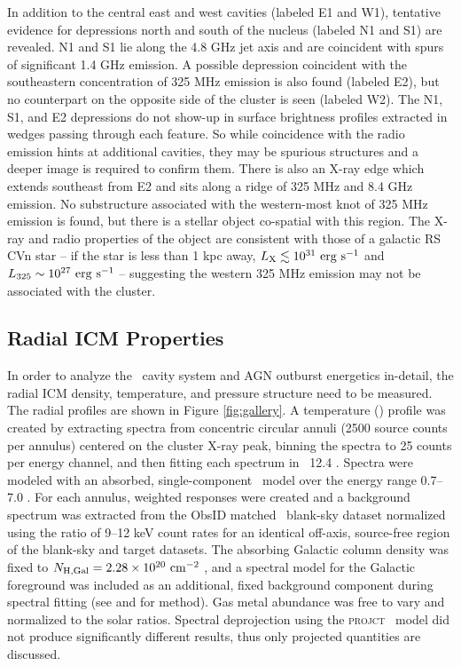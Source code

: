 \documentclass[apjpt4]{aastex}
\begin{document}
In addition to the central east and west cavities (labeled E1 and W1),
tentative evidence for depressions north and south of the nucleus
(labeled N1 and S1) are revealed. N1 and S1 lie along the 4.8 GHz jet
axis and are coincident with spurs of significant 1.4 GHz emission. A
possible depression coincident with the southeastern concentration of
325 MHz emission is also found (labeled E2), but no counterpart on the
opposite side of the cluster is seen (labeled W2). The N1, S1, and E2
depressions do not show-up in surface brightness profiles extracted in
wedges passing through each feature. So while coincidence with the
radio emission hints at additional cavities, they may be spurious
structures and a deeper image is required to confirm them. There is
also an X-ray edge which extends southeast from E2 and sits along a
ridge of 325 MHz and 8.4 GHz emission. No substructure associated with
the western-most knot of 325 MHz emission is found, but there is a
stellar object co-spatial with this region. The X-ray and radio
properties of the object are consistent with those of a galactic RS
CVn star \citep{1993RPPh...56.1145S} -- if the star is less than 1 kpc
away, $L_{\rm{X}} \lesssim 10^{31} ~\rm{\mbox{\ensuremath{\rm{erg}}}~\ensuremath{\rm{\mbox{\ensuremath{\rm{s}}}^{-1}}}}$ and $L_{325} \sim 10^{27} ~\rm{\mbox{\ensuremath{\rm{erg}}}~\ensuremath{\rm{\mbox{\ensuremath{\rm{s}}}^{-1}}}}$ --
suggesting the western 325 MHz emission may not be associated with the
cluster.

\subsection{Radial ICM Properties}
\label{sec:icm}

In order to analyze the \rbs\ cavity system and AGN outburst
energetics in-detail, the radial ICM density, temperature, and
pressure structure need to be measured. The radial profiles are shown
in Figure \ref{fig:gallery}. A temperature (\tx) profile was created
by extracting spectra from concentric circular annuli (2500 source
counts per annulus) centered on the cluster X-ray peak, binning the
spectra to 25 counts per energy channel, and then fitting each
spectrum in \xspec\ 12.4 \citep{xspec}. Spectra were modeled with an
absorbed, single-component \mekal\ model \citep{mekal1} over the
energy range 0.7--7.0 \keV. For each annulus, weighted responses were
created and a background spectrum was extracted from the ObsID matched
\caldb\ blank-sky dataset normalized using the ratio of 9--12 keV
count rates for an identical off-axis, source-free region of the
blank-sky and target datasets. The absorbing Galactic column density
was fixed to $N_{\rm{H,Gal}} = 2.28 \times 10^{20} ~\mbox{\ensuremath{\rm{cm^{-2}}}}$ \citep{lab}, and a
spectral model for the Galactic foreground was included as an
additional, fixed background component during spectral fitting (see
\citealt{2005ApJ...628..655V} and \citealt{xrayband} for method). Gas
metal abundance was free to vary and normalized to the \citet{ag89}
solar ratios. Spectral deprojection using the {\textsc{projct}}
\xspec\ model did not produce significantly different results, thus
only projected quantities are discussed.
\end{document}
